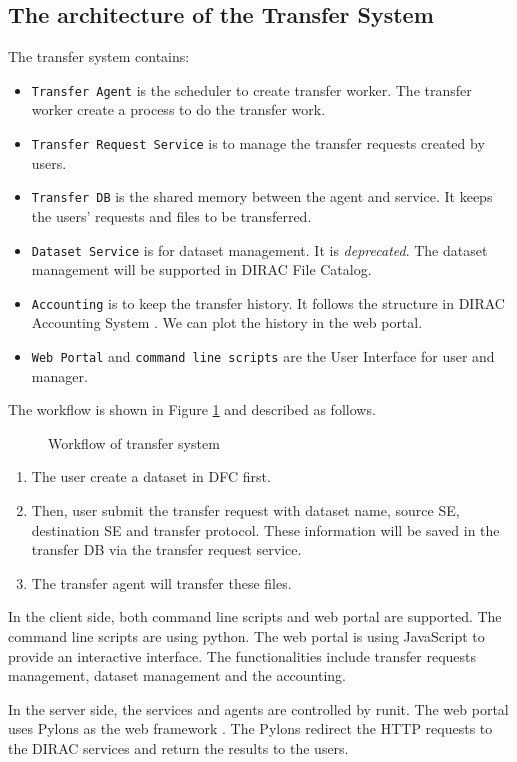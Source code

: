 \subsection{The architecture of the Transfer System}

The transfer system contains:

\begin{itemize}
    \item {\tt Transfer Agent} is the scheduler to create transfer worker.
          The transfer worker create a process to do the transfer work.
    \item {\tt Transfer Request Service} is to manage the transfer requests
          created by users.
    \item {\tt Transfer DB} is the shared memory between the agent and 
          service. It keeps the users' requests and files to be transferred.
    \item {\tt Dataset Service} is for dataset management. It is 
          {\em deprecated}. The dataset management will be supported in DIRAC
          File Catalog.
    \item {\tt Accounting} is to keep the transfer history.
          It follows the structure in DIRAC Accounting System
          \cite{bib:diracacct}.
          We can plot the history in the web portal.
    \item {\tt Web Portal} and {\tt command line scripts} are the 
          User Interface for user and manager.
\end{itemize}

The workflow is shown in Figure \ref{fig:workflow} and described as follows.
\begin{figure}
    
    \caption{Workflow of transfer system} \label{fig:workflow}
\end{figure}

\begin{enumerate}
\item The user create a dataset in DFC first.
\item Then, user submit the transfer request with dataset name,
source SE, destination SE and transfer protocol.
These information will be saved in the transfer DB via
the transfer request service.
\item The transfer agent will transfer these files.
\end{enumerate}

In the client side, both command line scripts and web portal are supported.
The command line scripts are using python. The web portal 
\cite{bib:webportal}
is using JavaScript to provide an interactive interface. The functionalities
include transfer requests management, dataset management and the 
accounting.

In the server side, the services and agents are controlled by runit.
The web portal uses Pylons as the web framework
\cite{bib:webportal}.
The Pylons redirect the HTTP requests to the DIRAC services and 
return the results to the users.
